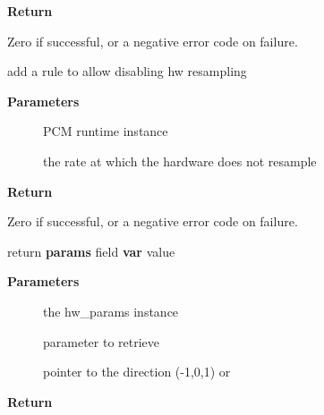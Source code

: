 \documentclass[a4paper,8pt,english]{sphinxmanual}
\begin{document}
\textbf{Return}

Zero if successful, or a negative error code on failure.

\begin{fulllineitems}
\label{sound/kernel-api/alsa-driver-api:c.snd_pcm_hw_rule_noresample}
add a rule to allow disabling hw resampling

\end{fulllineitems}


\textbf{Parameters}
\begin{description}
\item[{}] \leavevmode
PCM runtime instance

\item[{}] \leavevmode
the rate at which the hardware does not resample

\end{description}

\textbf{Return}

Zero if successful, or a negative error code on failure.

\begin{fulllineitems}
\label{sound/kernel-api/alsa-driver-api:c.snd_pcm_hw_param_value}
return \textbf{params} field \textbf{var} value

\end{fulllineitems}


\textbf{Parameters}
\begin{description}
\item[{}] \leavevmode
the hw\_params instance

\item[{}] \leavevmode
parameter to retrieve

\item[{}] \leavevmode
pointer to the direction (-1,0,1) or 

\end{description}

\textbf{Return}
\end{document}
